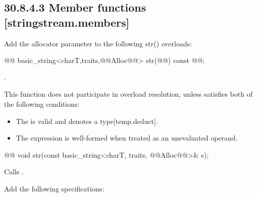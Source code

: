 \documentclass[ebook,11pt,article]{memoir}
\renewcommand{\iref}[1]{[#1]}
\begin{document}
\subsection{30.8.4.3 Member functions [stringstream.members]}
Add the allocator parameter to the following str() overloads:
\begin{itemdecl}
@@
basic_string<charT,traits,@@Alloc@@> str(@@) const @\added{\&}@;
\end{itemdecl}
\begin{itemdescr}
\pnum
\returns
{}.

\begin{addedblock}
\pnum %
\constraints 
This function does not participate in overload resolution, unless  satisfies both of the following conditions: 

\begin{itemize}
\item The  
is valid and denotes a type\iref{temp.deduct}.

\item The expression 
is well-formed when treated as an unevaluated operand.
\end{itemize}
\end{addedblock}
\end{itemdescr}

\begin{itemdecl}
@@
void str(const basic_string<charT, traits, @@Alloc@@>& s);
\end{itemdecl}

\begin{itemdescr}
\pnum
\effects
Calls
.
\end{itemdescr}


Add the following specifications:
\end{document}
